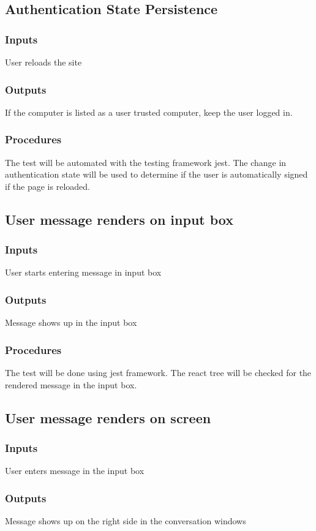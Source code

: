 \documentclass[12pt, titlepage]{article}
\begin{document}
\subsection{Authentication State Persistence}
\subsubsection{Inputs}
User reloads the site
\subsubsection{Outputs}
If the computer is listed as a user trusted computer, keep the user logged in.
\subsubsection{Procedures}
The test will be automated with the testing framework jest. The change in authentication state will be used to determine if the user is automatically signed if the page is reloaded.
\subsection{User message renders on input box}
\subsubsection{Inputs}
User starts entering message in input box
\subsubsection{Outputs}
Message shows up in the input box
\subsubsection{Procedures}
The test will be done using jest framework. The react tree will be checked for the rendered message in the input box.
\subsection{User message renders on screen}
\subsubsection{Inputs}
User enters message in the input box
\subsubsection{Outputs}
Message shows up on the right side in the conversation windows
\end{document}
